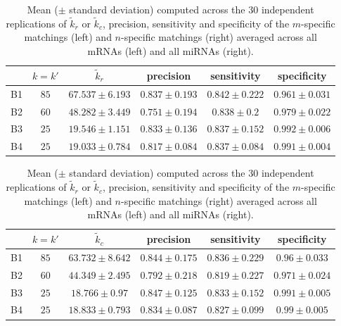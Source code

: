 \begin{table}
{\begin{minipage}{.5\linewidth}
\begin{tabular}{c|c|c|c|c|c}
        & $k=k'$ & $\tilde{k}_r$ & precision & sensitivity & specificity\\
        \hline
        B1&$ 85 $&$ 67.537 \pm 6.193 $&$ 0.837 \pm 0.193 $&$ 0.842 \pm 0.222 $&$ 0.961 \pm 0.031 $\\
        B2&$ 60 $&$ 48.282 \pm 3.449 $&$ 0.751 \pm 0.194 $&$ 0.838 \pm 0.2 $&$ 0.979 \pm 0.022 $\\
        B3&$ 25 $&$ 19.546 \pm 1.151 $&$ 0.833 \pm 0.136 $&$ 0.837 \pm 0.152 $&$ 0.992 \pm 0.006 $\\
        B4&$ 25 $&$ 19.033 \pm 0.784 $&$ 0.817 \pm 0.084 $&$ 0.837 \pm 0.084 $&$ 0.991 \pm 0.004 $\\
        \hline
      \end{tabular}
 \end{minipage}
    \begin{minipage}{.5\linewidth}
      \centering
          \begin{tabular}{c|c|c|c|c|c}
        & $k=k'$ & $\tilde{k}_c$ & precision & sensitivity & specificity\\
        \hline
        B1&$ 85 $&$ 63.732 \pm 8.642 $&$ 0.844 \pm 0.175 $&$ 0.836 \pm 0.229 $&$ 0.96 \pm 0.033 $\\
        B2&$ 60 $&$ 44.349 \pm 2.495 $&$ 0.792 \pm 0.218 $&$ 0.819 \pm 0.227 $&$ 0.971 \pm 0.024 $\\
        B3&$ 25 $&$ 18.766 \pm 0.97 $&$ 0.847 \pm 0.125 $&$ 0.833 \pm 0.152 $&$ 0.991 \pm 0.005 $\\
        B4&$ 25 $&$ 18.833 \pm 0.793 $&$ 0.834 \pm 0.087 $&$ 0.827 \pm 0.099 $&$ 0.99 \pm 0.005 $\\
        \hline
      \end{tabular}
    \end{minipage}
  \caption{Mean ($\pm$  standard deviation)
    computed  across  the  30  independent replications  of  $\tilde{k}_{r}$  or
    $\tilde{k}_{c}$, precision, sensitivity and  specificity of the $m$-specific
    matchings  (left) and  $n$-specific  matchings (right)  averaged across  all
    mRNAs (left) and all miRNAs (right).   \label{tab:simulB:results:matching} }
    }
\end{table}



